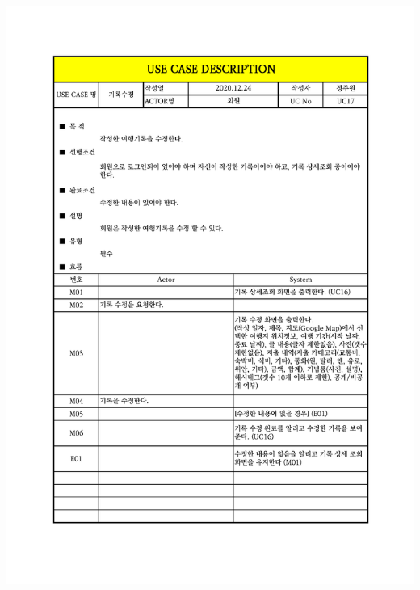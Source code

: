 {{{{{{{{{{{{{{{{{{{\includegraphics[width=1.1\textwidth]{./Figure/Design/Display/usecase/017.pdf} \\
}}}}}}}}}}}}}}}}}}}
